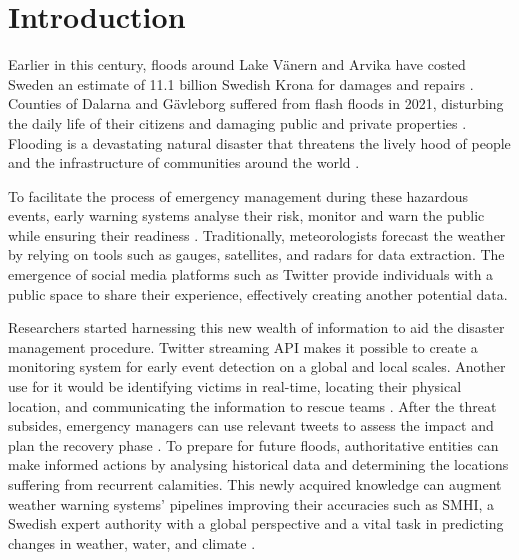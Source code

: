 \chapter{Introduction}

Earlier in this century, floods around Lake Vänern and Arvika have costed Sweden an estimate of 11.1
billion Swedish Krona for damages and repairs \cite{RiverFloodsSweden2022}. Counties of Dalarna and
Gävleborg suffered from flash floods in 2021, disturbing the daily life of their citizens and
damaging public and private properties \cite{daviesSwedenFlashFloods2021}. Flooding is a devastating
natural disaster that threatens the lively hood of people and the infrastructure of communities
around the world \cite{Floodlist2021}.

To facilitate the process of emergency management during these hazardous events, early warning
systems analyse their risk, monitor and warn the public while ensuring their readiness
\cite{contributorsEarlyWarningSystem2022}. Traditionally, meteorologists forecast the weather by
relying on tools such as gauges, satellites, and radars for data extraction. The emergence of social
media platforms such as Twitter provide individuals with a public space to share their experience,
effectively creating another potential data.

Researchers started harnessing this new wealth of information to aid the disaster management
procedure. Twitter streaming \ac{API} makes it possible to create a monitoring system for early
event detection on a global \cite{debruijnGlobalDatabaseHistoric2019b} and local
\cite{barkerDevelopmentNationalscaleRealtime2019} scales. Another use for it would be identifying
victims in real-time, locating their physical location, and communicating the information to rescue
teams \cite{singhEventClassificationLocation2019}. After the threat subsides, emergency managers can
use relevant tweets to assess the impact and plan the recovery phase
\cite{barkerDevelopmentNationalscaleRealtime2019}. To prepare for future floods, authoritative
entities can make informed actions by analysing historical data and determining the locations
suffering from recurrent calamities. This newly acquired knowledge can augment weather warning
systems' pipelines improving their accuracies such as \ac{SMHI}, a Swedish expert authority with a
global perspective and a vital task in predicting changes in weather, water, and climate
\cite{SMHI2021}.

